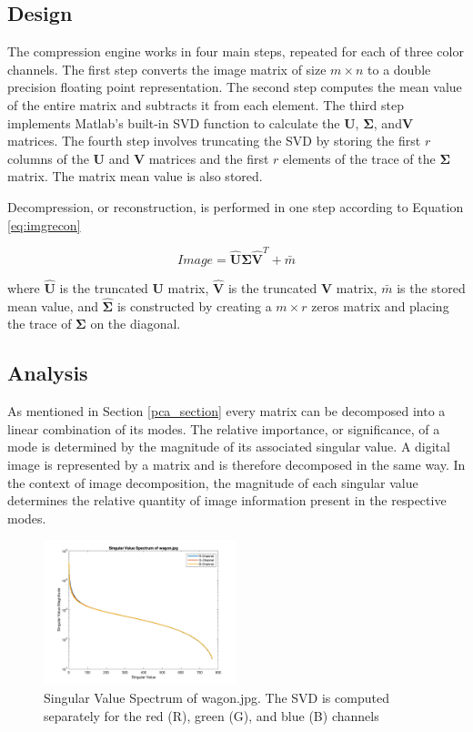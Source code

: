 \documentclass[conference]{IEEEtran}
\begin{document}
    \subsection{Design}
    The compression engine works in four main steps, repeated for each of three color channels. The first step converts the image matrix of size $m \times n$ to a double precision floating point representation. The second step computes the mean value of the entire matrix and subtracts it from each element. The third step implements Matlab's built-in SVD function to calculate the $\mathbf{U}$, $\mathbf{\Sigma}$, and$\mathbf{V}$ matrices. The fourth step involves truncating the SVD by storing the first $r$ columns of the $\mathbf{U}$ and $\mathbf{V}$ matrices and the first $r$ elements of the trace of the $\mathbf{\Sigma}$ matrix. The matrix mean value is also stored.

    Decompression, or reconstruction, is performed in one step according to Equation \ref{eq:imgrecon}

    \begin{equation}
		Image = \mathbf{\hat{U}}\mathbf{\hat{\Sigma}}\mathbf{\hat{V}}^T + \bar{m}
        \label{eq:imgrecon}
    \end{equation}

    where $\mathbf{\hat{U}}$ is the truncated $\mathbf{U}$ matrix, $\mathbf{\hat{V}}$ is the truncated $\mathbf{V}$ matrix, $\bar{m}$ is the stored mean value, and $\mathbf{\hat{\Sigma}}$ is constructed by creating a $m \times r$ zeros matrix and placing the trace of $\mathbf{\Sigma}$ on the diagonal.
    
    \subsection{Analysis}
    As mentioned in Section \ref{pca_section} every matrix can be decomposed into a linear combination of its modes. The relative importance, or significance, of a mode is determined by the magnitude of its associated singular value. A digital image is represented by a matrix and is therefore decomposed in the same way. In the context of image decomposition, the magnitude of each singular value determines the relative quantity of image information present in the respective modes.

	 \begin{figure}[t]
        \includegraphics[width=0.5\textwidth]{svals_wagon_rgb}
        \caption{Singular Value Spectrum of wagon.jpg. The SVD is computed separately for the red (R), green (G), and blue (B) channels}
        \label{fig:svalplot}
    \end{figure}
    
\end{document}
